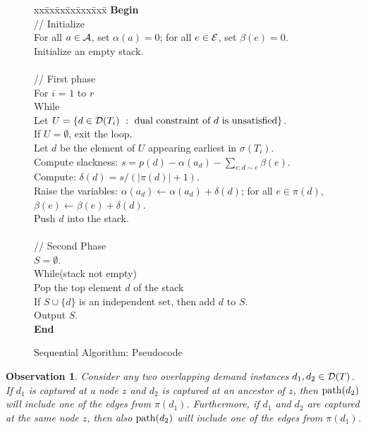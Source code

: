 \documentclass[11pt]{article}
\newtheorem{observation}[theorem]{\bf Observation}
\newcommand{\calA} {{\cal A}}
\newcommand{\calE} {{\cal E}}
\newcommand{\calD} {{\cal D}}
\newcommand{\mypath} {{\rm path}}
\begin{document}
\begin{figure}[t!]
\begin{center}
\begin{boxedminipage}{\hsize}
\begin{small}
\begin{tabbing}
xx\=xx\=xx\=xx\=xxx\=xxx\=\kill
\textbf{Begin}  \\
\> // Initialize \\
\> For all $a\in \calA$, set $\alpha(a)=0$; for all $e\in \calE$, set $\beta(e)=0$.\\
\> Initialize an empty stack.\\
\>\\
\> // First phase\\
\> For $i$ = $1$ to $r$\\
\> \> While\\
\> \> \>Let $U=\{d\in \calD(T_i)~:~\mbox{dual constraint of $d$ is unsatisfied}\}$.\\
\> \> \>If $U=\emptyset$, exit the loop.\\
\> \> \>Let $d$ be the element of $U$ appearing earliest in $\sigma(T_i)$.\\
\> \> \>Compute slackness: $s=p(d) - \alpha(a_d) - \sum_{e:d\sim e} \beta(e)$.\\
\> \> \>Compute: $\delta(d) = s/(|\pi(d)|+1)$.\\
\> \> \>Raise the variables: $\alpha(a_d) \leftarrow \alpha(a_d)+\delta(d)$; 
          for all $e\in \pi(d)$, $\beta(e) \leftarrow \beta(e)+\delta(d)$.\\
\> \> \>Push $d$ into the stack.\\
\>\\
\> // Second Phase\\
\> \> $S=\emptyset$.\\
\> \> While(stack not empty)\\
\> \> \> Pop the top element $d$ of the stack\\
\> \> \> If $S\cup \{d\}$ is an independent set, then add $d$ to $S$.\\
\> Output $S$.\\
\textbf{End}
\end{tabbing}
\end{small}
\end{boxedminipage}
\end{center}
\caption{Sequential Algorithm: Pseudocode}
\label{fig:Lewin-pseudo}
\end{figure}

\begin{observation}
\label{obs:AAA}
Consider any two overlapping demand instances $d_1, d_2\in \calD(T)$.
If $d_1$ is captured at a node $z$ and $d_2$ is captured at an ancestor of $z$,
then $\mypath(d_2)$ will include one of the edges from $\pi(d_1)$.
Furthermore, if $d_1$ and $d_2$ are captured at the same node $z$,
then also $\mypath(d_2)$ will include one of the edges from $\pi(d_1)$.
\end{observation}
\end{document}
